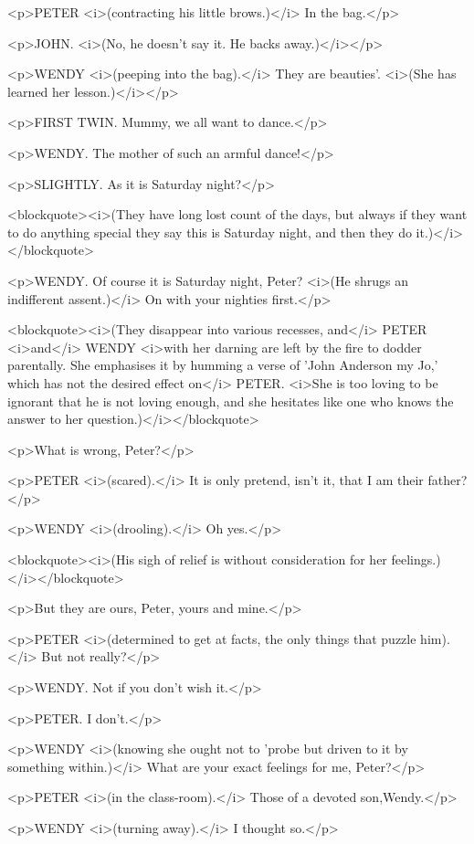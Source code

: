 <p>PETER <i>(contracting his little brows.)</i> In the bag.</p>

<p>JOHN. <i>(No, he doesn't say it. He backs away.)</i></p>

<p>WENDY <i>(peeping into the bag).</i> They are beauties'. <i>(She has learned her lesson.)</i></p>

<p>FIRST TWIN. Mummy, we all want to dance.</p>

<p>WENDY. The mother of such an armful dance!</p>

<p>SLIGHTLY. As it is Saturday night?</p>

<blockquote><i>(They have long lost count of the days, but always if they want to do anything special they say this is Saturday night, and then they do it.)</i></blockquote>

<p>WENDY. Of course it is Saturday night, Peter? <i>(He shrugs an indifferent assent.)</i> On with your nighties first.</p>

<blockquote><i>(They disappear into various recesses, and</i> PETER <i>and</i> WENDY <i>with her darning are left by the fire to dodder parentally. She emphasises it by humming a verse of 'John Anderson my Jo,' which has not the desired effect on</i> PETER. <i>She is too loving to be ignorant that he is not loving enough, and she hesitates like one who knows the answer to her question.)</i></blockquote>

<p>What is wrong, Peter?</p>

<p>PETER <i>(scared).</i> It is only pretend, isn't it, that I am their father?</p>

<p>WENDY <i>(drooling).</i> Oh yes.</p>

<blockquote><i>(His sigh of relief is without consideration for her feelings.)</i></blockquote>

<p>But they are ours, Peter, yours and mine.</p>

<p>PETER <i>(determined to get at facts, the only things that puzzle him).</i> But not really?</p>

<p>WENDY. Not if you don't wish it.</p>

<p>PETER. I don't.</p>

<p>WENDY <i>(knowing she ought not to 'probe but driven to it by something within.)</i> What are your exact feelings for me, Peter?</p>

<p>PETER <i>(in the class-room).</i> Those of a devoted son,Wendy.</p>

<p>WENDY <i>(turning away).</i> I thought so.</p>


